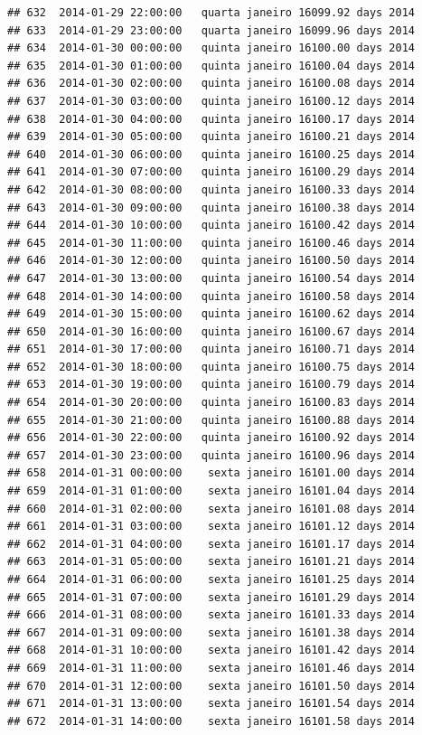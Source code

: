 \documentclass[]{book}
\begin{document}
\begin{verbatim}
## 632  2014-01-29 22:00:00   quarta janeiro 16099.92 days 2014
## 633  2014-01-29 23:00:00   quarta janeiro 16099.96 days 2014
## 634  2014-01-30 00:00:00   quinta janeiro 16100.00 days 2014
## 635  2014-01-30 01:00:00   quinta janeiro 16100.04 days 2014
## 636  2014-01-30 02:00:00   quinta janeiro 16100.08 days 2014
## 637  2014-01-30 03:00:00   quinta janeiro 16100.12 days 2014
## 638  2014-01-30 04:00:00   quinta janeiro 16100.17 days 2014
## 639  2014-01-30 05:00:00   quinta janeiro 16100.21 days 2014
## 640  2014-01-30 06:00:00   quinta janeiro 16100.25 days 2014
## 641  2014-01-30 07:00:00   quinta janeiro 16100.29 days 2014
## 642  2014-01-30 08:00:00   quinta janeiro 16100.33 days 2014
## 643  2014-01-30 09:00:00   quinta janeiro 16100.38 days 2014
## 644  2014-01-30 10:00:00   quinta janeiro 16100.42 days 2014
## 645  2014-01-30 11:00:00   quinta janeiro 16100.46 days 2014
## 646  2014-01-30 12:00:00   quinta janeiro 16100.50 days 2014
## 647  2014-01-30 13:00:00   quinta janeiro 16100.54 days 2014
## 648  2014-01-30 14:00:00   quinta janeiro 16100.58 days 2014
## 649  2014-01-30 15:00:00   quinta janeiro 16100.62 days 2014
## 650  2014-01-30 16:00:00   quinta janeiro 16100.67 days 2014
## 651  2014-01-30 17:00:00   quinta janeiro 16100.71 days 2014
## 652  2014-01-30 18:00:00   quinta janeiro 16100.75 days 2014
## 653  2014-01-30 19:00:00   quinta janeiro 16100.79 days 2014
## 654  2014-01-30 20:00:00   quinta janeiro 16100.83 days 2014
## 655  2014-01-30 21:00:00   quinta janeiro 16100.88 days 2014
## 656  2014-01-30 22:00:00   quinta janeiro 16100.92 days 2014
## 657  2014-01-30 23:00:00   quinta janeiro 16100.96 days 2014
## 658  2014-01-31 00:00:00    sexta janeiro 16101.00 days 2014
## 659  2014-01-31 01:00:00    sexta janeiro 16101.04 days 2014
## 660  2014-01-31 02:00:00    sexta janeiro 16101.08 days 2014
## 661  2014-01-31 03:00:00    sexta janeiro 16101.12 days 2014
## 662  2014-01-31 04:00:00    sexta janeiro 16101.17 days 2014
## 663  2014-01-31 05:00:00    sexta janeiro 16101.21 days 2014
## 664  2014-01-31 06:00:00    sexta janeiro 16101.25 days 2014
## 665  2014-01-31 07:00:00    sexta janeiro 16101.29 days 2014
## 666  2014-01-31 08:00:00    sexta janeiro 16101.33 days 2014
## 667  2014-01-31 09:00:00    sexta janeiro 16101.38 days 2014
## 668  2014-01-31 10:00:00    sexta janeiro 16101.42 days 2014
## 669  2014-01-31 11:00:00    sexta janeiro 16101.46 days 2014
## 670  2014-01-31 12:00:00    sexta janeiro 16101.50 days 2014
## 671  2014-01-31 13:00:00    sexta janeiro 16101.54 days 2014
## 672  2014-01-31 14:00:00    sexta janeiro 16101.58 days 2014

\end{verbatim}
\end{document}
